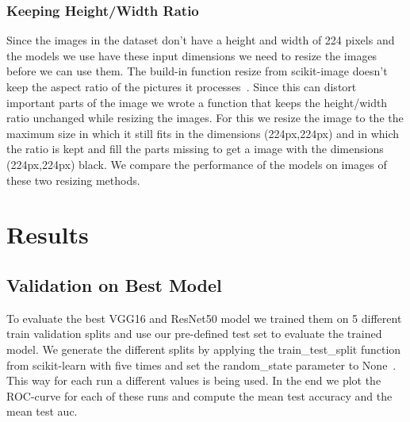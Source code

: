 \documentclass[sn-mathphys,Numbered]{sn-jnl}%
\theoremstyle{thmstyleone}%
\theoremstyle{thmstyletwo}%
\theoremstyle{thmstylethree}%
\begin{document}
\subsubsection{Keeping Height/Width Ratio}\label{HeightWidth}
Since the images in the dataset don't have a height and width of 224 pixels and the models we use have these input dimensions we need to resize the images before we can use them. The build-in function resize from scikit-image doesn't keep the aspect ratio of the pictures it processes~\cite{resize}. Since this can distort important parts of the image we wrote a function that keeps the height/width ratio unchanged while resizing the images. For this we resize the image to the the maximum size in which it still fits in the dimensions (224px,224px) and in which the ratio is kept and fill the parts missing to get a image with the dimensions (224px,224px) black. We compare the performance of the models on images of these two resizing methods.\\




\section{Results}\label{Results}
\subsection{Validation on Best Model}\label{CV_Results}
To evaluate the best VGG16 and ResNet50 model we trained them on 5 different train validation splits and use our pre-defined test set to evaluate the trained model. We generate the different splits by applying the train\_test\_split function from scikit-learn with five times and set the random\_state parameter to None~\cite{TTS}. This way for each run a different values is being used. In the end we plot the ROC-curve for each of these runs and compute the mean test accuracy and the mean test auc.\\
\end{document}
